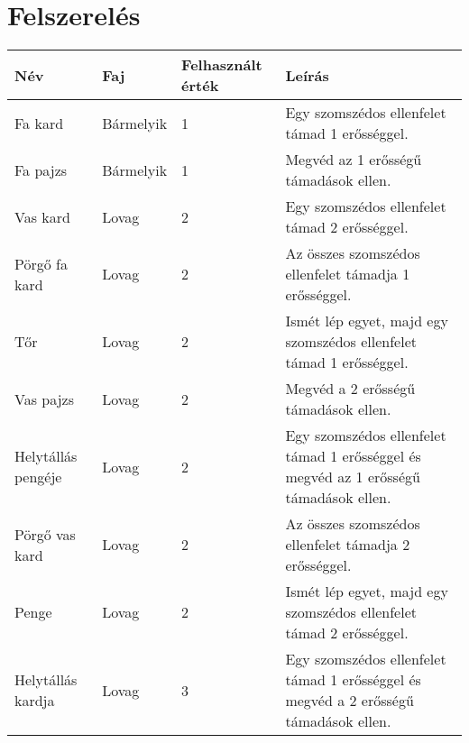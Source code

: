 \section{Felszerelés}
{\renewcommand{\arraystretch}{1.3}%

\begin{longtabu} to \textwidth {X[2l]|X[1.5l]|X[1.3c]|X[5l]}
	Név           & Faj      & Felhasznált érték & Leírás                                                                 \\  \hline \endhead
	Fa kard       & Bármelyik & 1                 & Egy szomszédos ellenfelet támad 1 erősséggel.                          \\ \hline
	Fa pajzs      & Bármelyik & 1                 & Megvéd az 1 erősségű támadások ellen.                                  \\ \hline
	Vas kard      & Lovag     & 2                 & Egy szomszédos ellenfelet támad 2 erősséggel.                          \\ \hline
	Pörgő fa kard & Lovag     & 2                 & Az összes szomszédos ellenfelet támadja 1 erősséggel.                  \\ \hline
	Tőr           & Lovag     & 2                 & Ismét lép egyet, majd egy szomszédos ellenfelet támad 1 erősséggel. \\ \hline
	Vas pajzs& Lovag          & 2                  &  Megvéd a 2 erősségű támadások ellen.                                                                  \\ \hline
	Helytállás pengéje& Lovag          &  2                 & Egy szomszédos ellenfelet támad 1 erősséggel és megvéd az 1 erősségű támadások ellen.                                                                        \\ \hline
	Pörgő vas kard&  Lovag         &   2                &  Az összes szomszédos ellenfelet támadja 2 erősséggel.                                                                       \\ \hline
	Penge & Lovag          &  2                 &    Ismét lép egyet, majd egy szomszédos ellenfelet támad 2 erősséggel.                                                                     \\ \hline
	Helytállás kardja&   Lovag        &      3             &  Egy szomszédos ellenfelet támad 1 erősséggel és megvéd a 2 erősségű támadások ellen.  \\ \hline

\end{longtabu}}

